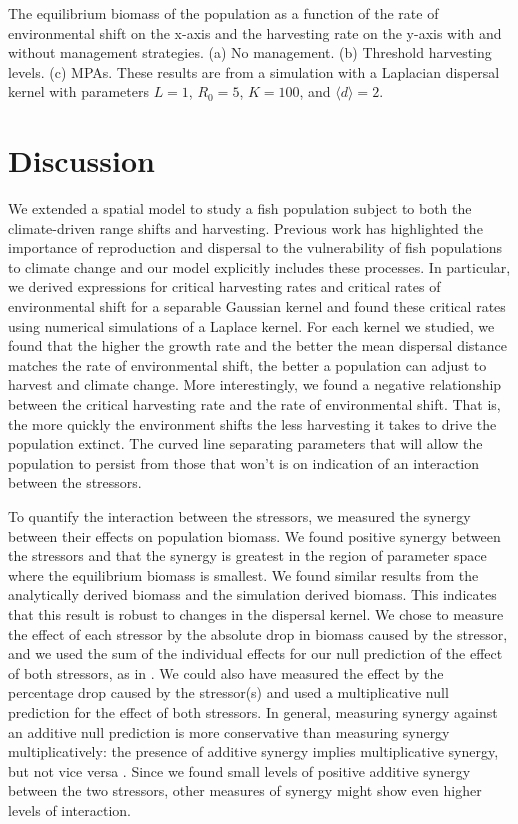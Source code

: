 \documentclass[12pt,english]{article}
\begin{document}
\pagebreak

The equilibrium biomass of the population as a function of the rate of environmental shift on the x-axis and the harvesting rate on the y-axis with and without management strategies.  (a) No management.  (b) Threshold harvesting levels.  (c) MPAs.  These results are from a simulation with a Laplacian dispersal kernel with parameters $L=1$, $R_0=5$, $K=100$, and $\langle d \rangle =2$.

\pagebreak

\section{Discussion}
We extended a spatial model to study a fish population subject to both the climate-driven range shifts and harvesting. Previous work has highlighted the importance of reproduction and dispersal to the vulnerability of fish populations to climate change \citep[\citet{Fordhametal2013}]{Hastingsetal2005} and our model explicitly includes these processes.  In particular, we derived expressions for critical harvesting rates and critical rates of environmental shift for a separable Gaussian kernel and found these critical rates using numerical simulations of a Laplace kernel.  For each kernel we studied, we found that the higher the growth rate and the better the mean dispersal distance matches the rate of environmental shift, the better a population can adjust to harvest and climate change.  More interestingly, we found a negative relationship between the critical harvesting rate and the rate of environmental shift.  That is, the more quickly the environment shifts the less harvesting it takes to drive the population extinct.  The curved line separating parameters that will allow the population to persist from those that won't is on indication of an interaction between the stressors.


To quantify the interaction between the stressors, we measured the synergy between their effects on population biomass.  We found positive synergy between the stressors and that the synergy is greatest in the region of parameter space where the equilibrium biomass is smallest.  We found similar results from the analytically derived biomass and the simulation derived biomass. This indicates that this result is robust to changes in the dispersal kernel.  We chose to measure the effect of each stressor by the absolute drop in biomass caused by the stressor, and we used the sum of the individual effects for our null prediction of the effect of both stressors, as in \citep{Crainetal2008, DarlingCote2008,Nyeetal2013}.  We could also have measured the effect by the percentage drop caused by the stressor(s) and used a multiplicative null prediction for the effect of both stressors.  In general, measuring synergy against an additive null prediction is more conservative than measuring synergy multiplicatively: the presence of additive synergy implies multiplicative synergy, but not vice versa \citep{Crainetal2008, Foltetal1999}.  Since we found small levels of positive additive synergy between the two stressors, other measures of synergy might show even higher levels of interaction. 
\end{document}
